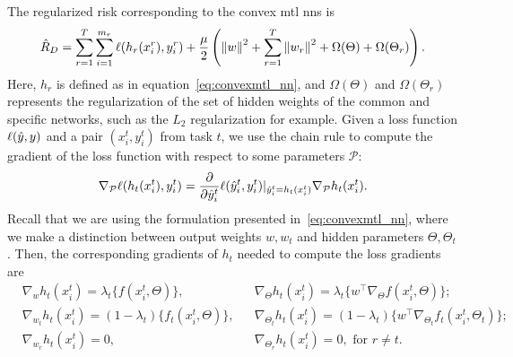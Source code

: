%
The regularized risk corresponding to the convex \acrshort{mtl} \acrshort{nns} is
\begin{equation}
    \nonumber
    \begin{aligned}
        \hat{R}_{D} = \sum_{r=1}^T \sum_{i=1}^{m_r} \ell(h_r(x_i^r), y_i^r) + \frac{\mu}{2} \left( \left\lVert w\right\rVert^2 + \sum_{r=1}^T \left\lVert w_r\right\rVert^2 + \Omega(\Theta) + \Omega(\Theta_r)\right) .
    \end{aligned}
\end{equation}
Here, $h_r$ is defined as in equation~\eqref{eq:convexmtl_nn}, and $\Omega(\Theta)$ and $\Omega(\Theta_r)$ represents the regularization of the set of hidden weights of the common and specific networks, such as the $L_2$ regularization for example.
Given a loss function $\ell(\hat{y}, y)$ and a pair $(x_i^t, y_i^t)$ from task $t$, we use the chain rule to compute the gradient of the loss function with respect to some parameters $\mathcal{P}$:
\begin{equation}
    \nonumber
    \nabla_\mathcal{P} \ell(h_t(x_i^t), y_i^t) = 
    \frac{\partial}{\partial \hat{y}_i^t} \ell(\hat{y}_i^t, y_i^t) \vert_{\hat{y}_i^t = h_t(x_i^t)} \nabla_\mathcal{P} h_t(x_i^t) .
\end{equation}
Recall that we are using the formulation presented in~\eqref{eq:convexmtl_nn},
where we make a distinction between output weights $w, w_t$ and hidden parameters $\Theta, \Theta_t$.
Then, the corresponding gradients of $h_t$ needed to compute the loss gradients are
\begin{equation}\label{eq:gradients_losses} 
    \begin{aligned}       
        &\nabla_{w} h_t(x_i^t)  
        = \lambda_t \lbrace f(x_i^t, \Theta) \rbrace ,
        &&\nabla_{\Theta} h_t(x_i^t)  
        = \lambda_t \lbrace w^\intercal \nabla_\Theta f(x_i^t, \Theta)\rbrace ; \\
        &\nabla_{w_t} h_t(x_i^t)  
        = (1 - \lambda_t) \lbrace f_t(x_i^t, \Theta) \rbrace ,
        &&\nabla_{\Theta_t} h_t(x_i^t)  
        = (1 - \lambda_t) \lbrace  w^\intercal \nabla_{\Theta_t} f_t(x_i^t, \Theta_t)\rbrace ; \\
        &\nabla_{w_r} h_t(x_i^t)  
        =  0 , 
        &&\nabla_{\Theta_r} h_t(x_i^t)  
        =  0 , \text{ for } r \neq t .\\
    \end{aligned}    
\end{equation}
